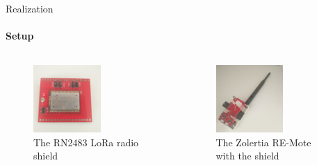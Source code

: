 \begin{frame}{Realization}
\framesubtitle{Setup}
\begin{columns}
\begin{column}{0.5\textwidth}

\begin{figure}[H]
    \centering
    \includegraphics[width=0.6\textwidth]{presentation.tex/fig/rn2483.jpg}
    \caption{The RN2483 LoRa radio shield\label{fig:rn2483pic}}
\end{figure}
\end{column}
\begin{column}{0.5\textwidth}
\begin{figure}[H]
    \centering
    \includegraphics[width=0.6\textwidth]{presentation.tex/fig/zolertia.jpg}
    \caption{The Zolertia RE-Mote with the shield\label{fig:zolpic}}
\end{figure}
\end{column}
\end{columns}
\end{frame}


